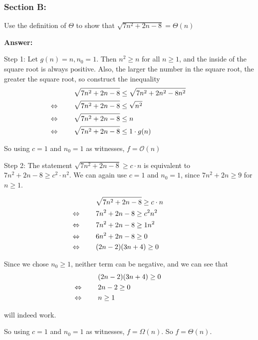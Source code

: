 \documentclass[14pt]{extreport}
\newcommand{\eq}[0]{\llap{\( \Leftrightarrow \) \qquad}}
\newcommand{\answer}[0]{\medskip \textbf{Answer:} \medskip}
\newcommand{\Bigo}[0]{\mathcal{O}}
\begin{document}
\subsubsection*{Section B:}

Use the definition of \( \Theta \) to show that \( \sqrt{7n^2 + 2n - 8} = \Theta(n) \)
        
    \answer

    Step 1: Let \( g(n) = n, n_0 = 1 \). Then \( n^2 \geq n \) for all \( n \geq 1 \), and the inside of the square root is always positive. Also, the larger the number in the square root, the greater the square root, so construct the inequality
    \begin{align*}
        & \sqrt{7n^2 + 2n - 8} \leq \sqrt{7n^2 + 2n^2 - 8n^2} \\
        &\eq \sqrt{7n^2 + 2n - 8} \leq \sqrt{n^2} \\
        &\eq \sqrt{7n^2 + 2n - 8} \leq n \\
        &\eq \sqrt{7n^2 + 2n - 8} \leq 1 \cdot g(n)
    \end{align*}

    So using \( c = 1 \) and \( n_0 = 1 \) as witnesses, \( f = \Bigo(n) \)

    \medskip

    Step 2: The statement \( \sqrt{7n^2 + 2n - 8} \geq c \cdot n \) is equivalent to \( 7n^2 + 2n - 8 \geq c^2 \cdot n^2 \). We can again use \( c = 1 \) and \( n_0 = 1 \), since \( 7n^2 + 2n \geq 9 \) for \( n \geq 1 \).

    \begin{align*}
        & \sqrt{7n^2 + 2n - 8} \geq c \cdot n \\
        &\eq 7n^2 + 2n - 8 \geq c^2 n^2 \\
        &\eq 7n^2 + 2n - 8 \geq 1 n^2 \\
        &\eq 6n^2 + 2n - 8 \geq 0 \\
        &\eq (2n - 2)(3n + 4) \geq 0
    \end{align*}

    Since we chose \( n_0 \geq 1 \), neither term can be negative, and we can see that
    \begin{align*}
        & (2n - 2)(3n + 4) \geq 0 \\
        &\eq 2n - 2 \geq 0 \\
        &\eq n \geq 1
    \end{align*}

    will indeed work.
    
    So using \( c = 1 \) and \( n_0 = 1 \) as witnesses, \( f = \Omega(n) \). So \( f = \Theta(n) \).
\end{document}
